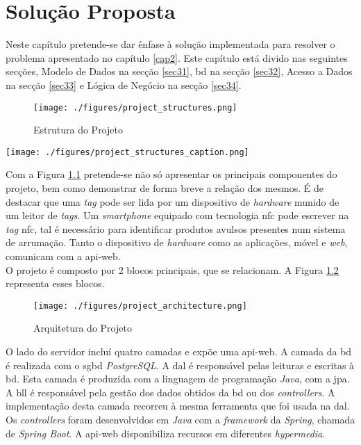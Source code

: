 %
%
\chapter{Solução Proposta} \label{cap3}

Neste capítulo pretende-se dar ênfase à solução implementada para resolver o problema apresentado no capítulo \ref{cap2}. Este capítulo está divido nas seguintes secções, Modelo de Dados na secção \ref{sec31}, \acrlong{bd} na secção \ref{sec32}, Acesso a Dados na secção \ref{sec33} e Lógica de Negócio na secção \ref{sec34}.

\begin{figure}[H]
	\centering
	\texttt{[image: ./figures/project\_structures.png]}
	\caption{Estrutura do Projeto}
	\label{project-structure}
\end{figure}

\begin{center}
	\texttt{[image: ./figures/project\_structures\_caption.png]}
\end{center}

Com a Figura \ref{project-structure} pretende-se não só apresentar os principais componentes do projeto, bem como demonstrar de forma breve a relação dos mesmos. É de destacar que uma \textit{tag} pode ser lida por um dispositivo de \textit{hardware} munido de um leitor de \textit{tags}. Um \textit{smartphone} equipado com tecnologia \acrshort{nfc} pode escrever na \textit{tag} \acrshort{nfc}, tal é necessário para identificar produtos avulsos presentes num sistema de arrumação. Tanto o dispositivo de \textit{hardware} como as aplicações, móvel e \textit{web}, comunicam com a \gls{api-web}.\\

O projeto é composto por 2 blocos principais, que se relacionam. A Figura \ref{project-architecture} representa esses blocos. 

\begin{figure}[H]
	\centering
	\texttt{[image: ./figures/project\_architecture.png]}
	\caption{Arquitetura do Projeto}
	\label{project-architecture}
\end{figure}

O lado do servidor incluí quatro camadas e expõe uma \gls{api-web}. A camada da \acrfull{bd} é realizada com o \acrfull{sgbd} \textit{PostgreSQL}. A \acrfull{dal} é responsável pelas leituras e escritas à \acrshort{bd}. Esta camada é produzida com a linguagem de programação \textit{Java}, com a \acrfull{jpa}. A \acrfull{bll} é responsável pela gestão dos dados obtidos da \acrshort{bd} ou dos \textit{controllers}. A implementação desta camada recorreu à mesma ferramenta que foi usada na \acrshort{dal}. Os \textit{controllers} foram desenvolvidos em \textit{Java} com a \textit{framework} da \textit{Spring}, chamada de \textit{Spring Boot}. A \gls{api-web} disponibiliza recursos em diferentes \textit{hypermedia}.

